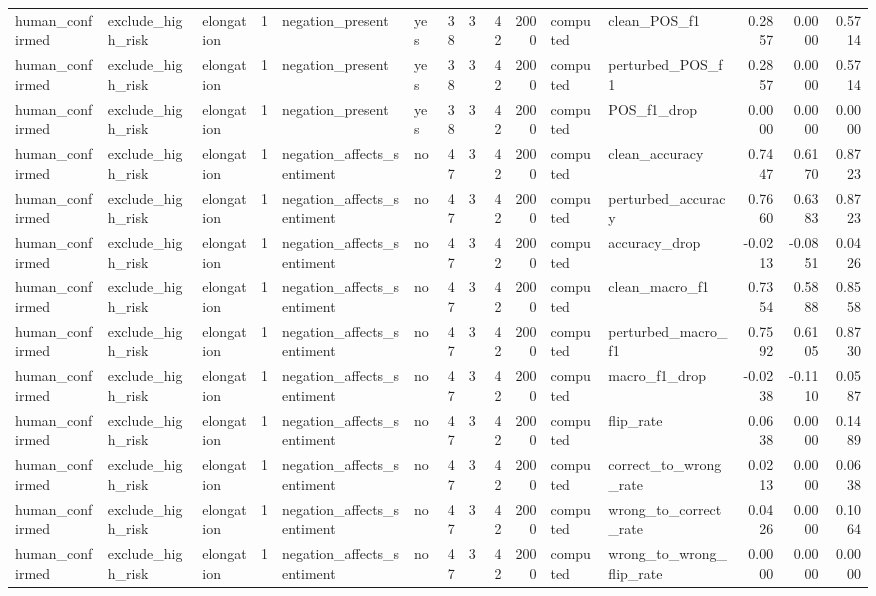 \begin{tabular}{lllrllrrrrllrrr}
human_confirmed & exclude_high_risk & elongation & 1 & negation_present & yes & 38 & 3 & 42 & 2000 & computed & clean_POS_f1 & 0.2857 & 0.0000 & 0.5714 \\
human_confirmed & exclude_high_risk & elongation & 1 & negation_present & yes & 38 & 3 & 42 & 2000 & computed & perturbed_POS_f1 & 0.2857 & 0.0000 & 0.5714 \\
human_confirmed & exclude_high_risk & elongation & 1 & negation_present & yes & 38 & 3 & 42 & 2000 & computed & POS_f1_drop & 0.0000 & 0.0000 & 0.0000 \\
human_confirmed & exclude_high_risk & elongation & 1 & negation_affects_sentiment & no & 47 & 3 & 42 & 2000 & computed & clean_accuracy & 0.7447 & 0.6170 & 0.8723 \\
human_confirmed & exclude_high_risk & elongation & 1 & negation_affects_sentiment & no & 47 & 3 & 42 & 2000 & computed & perturbed_accuracy & 0.7660 & 0.6383 & 0.8723 \\
human_confirmed & exclude_high_risk & elongation & 1 & negation_affects_sentiment & no & 47 & 3 & 42 & 2000 & computed & accuracy_drop & -0.0213 & -0.0851 & 0.0426 \\
human_confirmed & exclude_high_risk & elongation & 1 & negation_affects_sentiment & no & 47 & 3 & 42 & 2000 & computed & clean_macro_f1 & 0.7354 & 0.5888 & 0.8558 \\
human_confirmed & exclude_high_risk & elongation & 1 & negation_affects_sentiment & no & 47 & 3 & 42 & 2000 & computed & perturbed_macro_f1 & 0.7592 & 0.6105 & 0.8730 \\
human_confirmed & exclude_high_risk & elongation & 1 & negation_affects_sentiment & no & 47 & 3 & 42 & 2000 & computed & macro_f1_drop & -0.0238 & -0.1110 & 0.0587 \\
human_confirmed & exclude_high_risk & elongation & 1 & negation_affects_sentiment & no & 47 & 3 & 42 & 2000 & computed & flip_rate & 0.0638 & 0.0000 & 0.1489 \\
human_confirmed & exclude_high_risk & elongation & 1 & negation_affects_sentiment & no & 47 & 3 & 42 & 2000 & computed & correct_to_wrong_rate & 0.0213 & 0.0000 & 0.0638 \\
human_confirmed & exclude_high_risk & elongation & 1 & negation_affects_sentiment & no & 47 & 3 & 42 & 2000 & computed & wrong_to_correct_rate & 0.0426 & 0.0000 & 0.1064 \\
human_confirmed & exclude_high_risk & elongation & 1 & negation_affects_sentiment & no & 47 & 3 & 42 & 2000 & computed & wrong_to_wrong_flip_rate & 0.0000 & 0.0000 & 0.0000 \\

\end{tabular}
